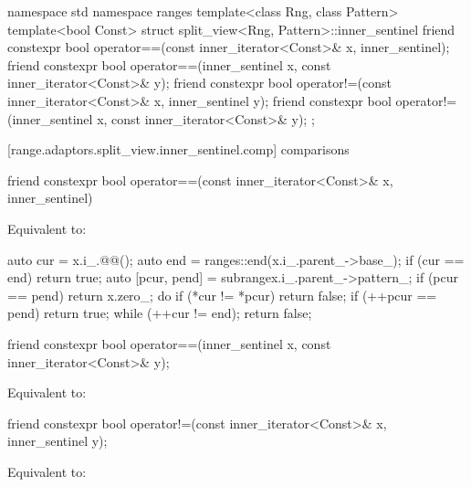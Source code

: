{{\begin{codeblock}
namespace std { namespace ranges {
  template<class Rng, class Pattern>
  template<bool Const>
  struct split_view<Rng, Pattern>::inner_sentinel {
    friend constexpr bool operator==(const inner_iterator<Const>& x, inner_sentinel);
    friend constexpr bool operator==(inner_sentinel x, const inner_iterator<Const>& y);
    friend constexpr bool operator!=(const inner_iterator<Const>& x, inner_sentinel y);
    friend constexpr bool operator!=(inner_sentinel x, const inner_iterator<Const>& y);
  };
}}
\end{codeblock}

[range.adaptors.split_view.inner_sentinel.comp]{ comparisons}

%
\begin{itemdecl}
friend constexpr bool operator==(const inner_iterator<Const>& x, inner_sentinel)
\end{itemdecl}

\begin{itemdescr}
\pnum
\effects Equivalent to:
\begin{codeblock}
auto cur = x.i_.@@();
auto end = ranges::end(x.i_.parent_->base_);
if (cur == end) return true;
auto [pcur, pend] = subrange{x.i_.parent_->pattern_};
if (pcur == pend) return x.zero_;
do {
  if (*cur != *pcur) return false;
  if (++pcur == pend) return true;
} while (++cur != end);
return false;
\end{codeblock}
\end{itemdescr}

%
\begin{itemdecl}
friend constexpr bool operator==(inner_sentinel x, const inner_iterator<Const>& y);
\end{itemdecl}

\begin{itemdescr}
\pnum
\effects Equivalent to: 
\end{itemdescr}

%
\begin{itemdecl}
friend constexpr bool operator!=(const inner_iterator<Const>& x, inner_sentinel y);
\end{itemdecl}

\begin{itemdescr}
\pnum
\effects Equivalent to: 
\end{itemdescr}

}}
